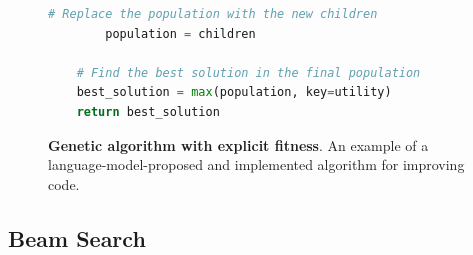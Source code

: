 \documentclass{article}
\begin{document}
\begin{figure}[h]
\begin{mybox}
\begin{lstlisting}[language=Python]
        # Replace the population with the new children
        population = children

    # Find the best solution in the final population
    best_solution = max(population, key=utility)
    return best_solution
\end{lstlisting}
\end{mybox}
\vspace{-6pt}
  \caption{\textbf{Genetic algorithm with explicit fitness}. An example of a language-model-proposed and implemented algorithm for improving code. } 
  \label{fig:genextwo}

\end{figure}

\clearpage
\newpage

\subsection{Beam Search}
\end{document}
